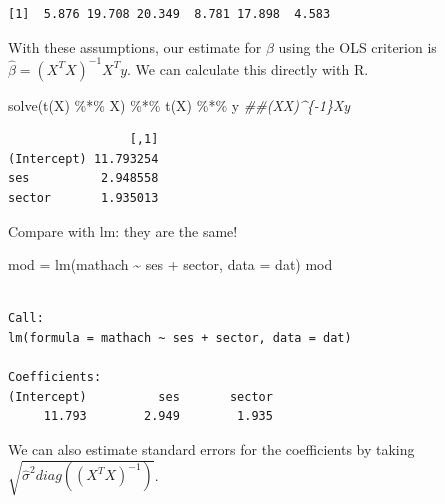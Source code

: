\documentclass[
  letterpaper,
  DIV=11,
  numbers=noendperiod]{scrreprt}
\newenvironment{Shaded}{\begin{snugshade}}{\end{snugshade}}
\newcommand{\AttributeTok}[1]{\textcolor[rgb]{0.49,0.56,0.16}{#1}}
\newcommand{\DocumentationTok}[1]{\textcolor[rgb]{0.73,0.13,0.13}{\textit{#1}}}
\newcommand{\FunctionTok}[1]{\textcolor[rgb]{0.02,0.16,0.49}{#1}}
\newcommand{\NormalTok}[1]{\textcolor[rgb]{0.00,0.44,0.13}{#1}}
\newcommand{\OtherTok}[1]{\textcolor[rgb]{0.00,0.44,0.13}{#1}}
\newcommand{\SpecialCharTok}[1]{\textcolor[rgb]{0.25,0.44,0.63}{#1}}
\begin{document}
\begin{verbatim}
[1]  5.876 19.708 20.349  8.781 17.898  4.583
\end{verbatim}

With these assumptions, our estimate for \(\beta\) using the OLS
criterion is \(\hat{\beta} = (X^TX)^{-1}X^Ty\). We can calculate this
directly with R.

\begin{Shaded}
\begin{Highlighting}[]
\FunctionTok{solve}\NormalTok{(}\FunctionTok{t}\NormalTok{(X) }\SpecialCharTok{\%*\%}\NormalTok{ X) }\SpecialCharTok{\%*\%} \FunctionTok{t}\NormalTok{(X) }\SpecialCharTok{\%*\%}\NormalTok{ y }\DocumentationTok{\#\#(X\textquotesingle{}X)\^{}\{{-}1\}X\textquotesingle{}y}
\end{Highlighting}
\end{Shaded}

\begin{verbatim}
                 [,1]
(Intercept) 11.793254
ses          2.948558
sector       1.935013
\end{verbatim}

Compare with lm: they are the same!

\begin{Shaded}
\begin{Highlighting}[]
\NormalTok{mod }\OtherTok{=} \FunctionTok{lm}\NormalTok{(mathach }\SpecialCharTok{\textasciitilde{}}\NormalTok{ ses }\SpecialCharTok{+}\NormalTok{ sector, }\AttributeTok{data =}\NormalTok{ dat)}
\NormalTok{mod }
\end{Highlighting}
\end{Shaded}

\begin{verbatim}

Call:
lm(formula = mathach ~ ses + sector, data = dat)

Coefficients:
(Intercept)          ses       sector  
     11.793        2.949        1.935  
\end{verbatim}

We can also estimate standard errors for the coefficients by taking
\(\sqrt{\hat{\sigma}^2diag((X^TX)^{-1})}\).
\end{document}
